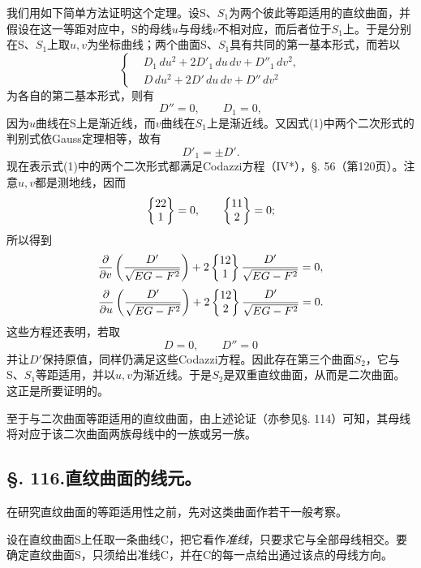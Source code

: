 我们用如下简单方法证明这个定理。设S、\(S_1\)为两个彼此等距适用的直纹曲面，并假设在这一等距对应中，S的母线\(u\)与母线\(v\)不相对应，而后者位于\(S_1\)上。于是分别在S、\(S_1\)上取\(u,v\)为坐标曲线；两个曲面S、\(S_1\)具有共同的第一基本形式，而若以
\begin{equation}\tag{1}
\left\{
\begin{aligned}
&D_1\,du^2+2D'_1\,du\,dv+D''_1\,dv^2,\\
&D\,du^2+2D'\,du\,dv+D''\,dv^2
\end{aligned}
\right.
\end{equation}
为各自的第二基本形式，则有
\[
 D''=0,
 \qquad D_1=0,
\]
因为\(u\)曲线在S上是渐近线，而\(v\)曲线在\(S_1\)上是渐近线。又因式(1)中两个二次形式的判别式依Gauss定理相等，故有
\[
 D'_1=\pm D'.
\]
现在表示式(1)中的两个二次形式都满足Codazzi方程（IV*），\S. 56（第120页）。注意\(u,v\)都是测地线，因而
\[
 \left\{\begin{matrix}22\\1\end{matrix}\right\}=0,
 \qquad
 \left\{\begin{matrix}11\\2\end{matrix}\right\}=0;
\]
所以得到
\[
 \frac{\partial}{\partial v}\left(\frac{D'}{\sqrt{EG-F^2}}\right)
  +2\left\{\begin{matrix}12\\1\end{matrix}\right\}\frac{D'}{\sqrt{EG-F^2}}=0,
\]
\[
 \frac{\partial}{\partial u}\left(\frac{D'}{\sqrt{EG-F^2}}\right)
+2\left\{\begin{matrix}12\\2\end{matrix}\right\}\frac{D'}{\sqrt{EG-F^2}}=0.
\]
这些方程还表明，若取
\[
 D=0,
 \qquad D''=0
\]
并让\(D'\)保持原值，同样仍满足这些Codazzi方程。因此存在第三个曲面\(S_2\)，它与S、\(S_1\)等距适用，并以\(u,v\)为渐近线。于是\(S_2\)是双重直纹曲面，从而是二次曲面。这正是所要证明的。

至于与二次曲面等距适用的直纹曲面，由上述论证（亦参见\S. 114）可知，其母线将对应于该二次曲面两族母线中的一族或另一族。

\subsection*{\S. 116.\quad 直纹曲面的线元。}

在研究直纹曲面的等距适用性之前，先对这类曲面作若干一般考察。

设在直纹曲面S上任取一条曲线C，把它看作\emph{准线}，只要求它与全部母线相交。要确定直纹曲面S，只须给出准线C，并在C的每一点给出通过该点的母线方向。

